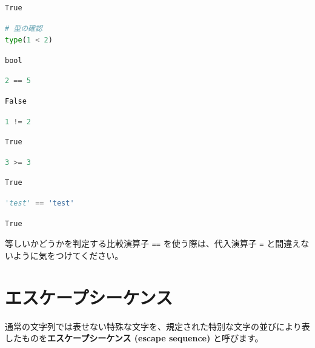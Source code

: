 \begin{lstlisting}[style=outputcell]
True
\end{lstlisting}

\begin{lstlisting}[style=codecell,language=Python]
# 型の確認
type(1 < 2)
\end{lstlisting}

\begin{lstlisting}[style=outputcell]
bool
\end{lstlisting}

\begin{lstlisting}[style=codecell,language=Python]
2 == 5
\end{lstlisting}

\begin{lstlisting}[style=outputcell]
False
\end{lstlisting}

\begin{lstlisting}[style=codecell,language=Python]
1 != 2
\end{lstlisting}

\begin{lstlisting}[style=outputcell]
True
\end{lstlisting}

\begin{lstlisting}[style=codecell,language=Python]
3 >= 3
\end{lstlisting}

\begin{lstlisting}[style=outputcell]
True
\end{lstlisting}

\begin{lstlisting}[style=codecell,language=Python]
'test' == 'test'
\end{lstlisting}

\begin{lstlisting}[style=outputcell]
True
\end{lstlisting}

等しいかどうかを判定する比較演算子 \texttt{==} を使う際は、代入演算子 \texttt{=} と間違えないように気をつけてください。


\section{エスケープシーケンス}


通常の文字列では表せない特殊な文字を、規定された特別な文字の並びにより表したものを\textbf{エスケープシーケンス (escape sequence)} と呼びます。



